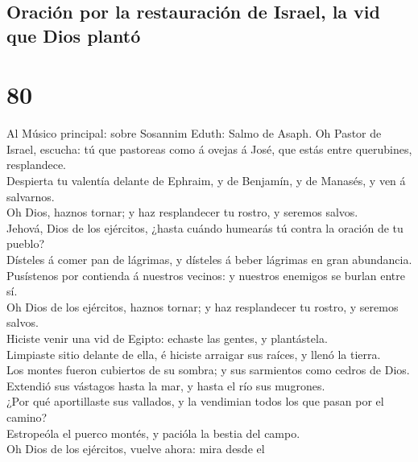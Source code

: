 \hypertarget{oraciuxf3n-por-la-restauraciuxf3n-de-israel-la-vid-que-dios-plantuxf3}{%
\subsection{Oración por la restauración de Israel, la vid que Dios
plantó}\label{oraciuxf3n-por-la-restauraciuxf3n-de-israel-la-vid-que-dios-plantuxf3}}

\hypertarget{section-79}{%
\section{80}\label{section-79}}

 Al Músico principal: sobre Sosannim Eduth: Salmo de
Asaph. Oh Pastor de Israel, escucha: tú que pastoreas como á ovejas á
José, que estás entre querubines, resplandece.\\
 Despierta tu valentía delante de Ephraim, y de Benjamín,
y de Manasés, y ven á salvarnos.\\
 Oh Dios, haznos tornar; y haz resplandecer tu rostro, y
seremos salvos.\\
 Jehová, Dios de los ejércitos, ¿hasta cuándo humearás tú
contra la oración de tu pueblo?\\
 Dísteles á comer pan de lágrimas, y dísteles á beber
lágrimas en gran abundancia.\\
 Pusístenos por contienda á nuestros vecinos: y nuestros
enemigos se burlan entre sí.\\
 Oh Dios de los ejércitos, haznos tornar; y haz
resplandecer tu rostro, y seremos salvos.\\
 Hiciste venir una vid de Egipto: echaste las gentes, y
plantástela.\\
 Limpiaste sitio delante de ella, é hiciste arraigar sus
raíces, y llenó la tierra.\\
 Los montes fueron cubiertos de su sombra; y sus
sarmientos como cedros de Dios.\\
 Extendió sus vástagos hasta la mar, y hasta el río sus
mugrones.\\
 ¿Por qué aportillaste sus vallados, y la vendimian todos
los que pasan por el camino?\\
 Estropeóla el puerco montés, y pacióla la bestia del
campo.\\
 Oh Dios de los ejércitos, vuelve ahora: mira desde el
